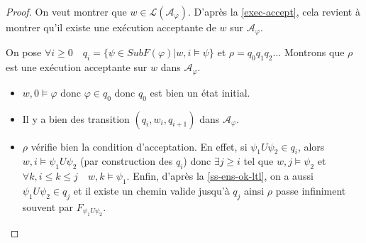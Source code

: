 \documentclass[12pt,a4paper]{article}
\theoremstyle{plain}
\theoremstyle{definition}
\begin{document}
\begin{proof}
  On veut montrer que $w \in \mathcal{L}(\mathcal{A}_\varphi)$.
  D'après la \cref{exec-accept}, cela revient à montrer qu'il existe une exécution acceptante de $w$ sur $\mathcal{A}_\varphi$.

  On pose $\forall i \geq 0 \quad q_i = \{ \psi \in SubF(\varphi) | w, i \models \psi\}$ et $\rho = q_0q_1q_2\dots$
  Montrons que $\rho$ est une exécution acceptante sur $w$ dans $\mathcal{A}_\varphi$.
  \begin{itemize}
  \item $w, 0 \models \varphi$ donc
    $\varphi \in q_0$ donc
    $q_0$ est bien un état initial.
  \item Il y a bien des transition $(q_i, w_i, q_{i+1})$ dans $\mathcal{A}_\varphi$.
  \item $\rho$ vérifie bien la condition d'acceptation.
    En effet, si $\psi_1 U \psi_2 \in q_i$, alors $w, i \models \psi_1 U \psi_2$ (par construction des $q_i$)
    donc $\exists j \geq i$ tel que $w,j \models \psi_2$ et $\forall k, i \leq k \leq j \quad w, k \models \psi_1$.
    Enfin, d'après la \cref{ss-ens-ok-ltl}, on a aussi $\psi_1 U \psi_2 \in q_j$ et il existe un chemin valide jusqu'à $q_j$ ainsi $\rho$ passe infiniment souvent par $F_{\psi_1 U \psi_2}$.
  \end{itemize}
\end{proof}
\end{document}
